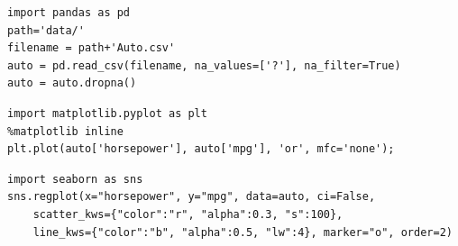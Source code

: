 

\begin{frame}[fragile]
\tiny
\begin{lstlisting}
import pandas as pd
path='data/'
filename = path+'Auto.csv'
auto = pd.read_csv(filename, na_values=['?'], na_filter=True)
auto = auto.dropna()
\end{lstlisting} 
\pause
\begin{lstlisting}
import matplotlib.pyplot as plt
%matplotlib inline
plt.plot(auto['horsepower'], auto['mpg'], 'or', mfc='none');
\end{lstlisting} 
\pause

\begin{lstlisting}
import seaborn as sns           
sns.regplot(x="horsepower", y="mpg", data=auto, ci=False,
    scatter_kws={"color":"r", "alpha":0.3, "s":100},
    line_kws={"color":"b", "alpha":0.5, "lw":4}, marker="o", order=2)
    \end{lstlisting} 
\end{frame}

